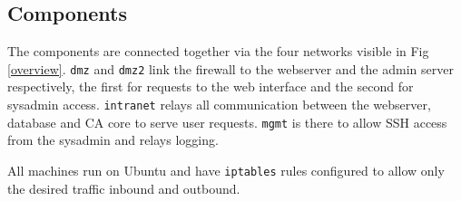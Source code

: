\documentclass[english]{article}
\begin{document}
\subsection{Components}
\label{Components}

The components are connected together via the four networks visible in Fig \ref{overview}. \texttt{dmz} and \texttt{dmz2} link the firewall to the webserver and the admin server respectively, the first for requests to the web interface and the second for sysadmin access. \texttt{intranet} relays all communication between the webserver, database and CA core to serve user requests. \texttt{mgmt} is there to allow SSH access from the sysadmin and relays logging.

All machines run on Ubuntu and have \texttt{iptables} rules configured to allow only the desired traffic inbound and outbound.
\end{document}
